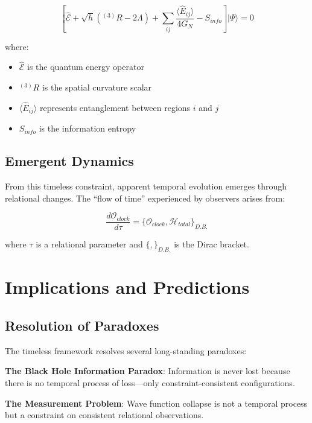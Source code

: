 \documentclass[12pt,a4paper]{article}
\begin{document}
\begin{equation}
\boxed{
\left[ \hat{\mathcal{E}} + \sqrt{h}\left({}^{(3)}R - 2\Lambda\right) + \sum_{ij} \frac{\langle \hat{E}_{ij} \rangle}{4G_N} - S_{info} \right] |\Psi\rangle = 0
}
\end{equation}

where:
\begin{itemize}
\item $\hat{\mathcal{E}}$ is the quantum energy operator
\item ${}^{(3)}R$ is the spatial curvature scalar
\item $\langle \hat{E}_{ij} \rangle$ represents entanglement between regions $i$ and $j$
\item $S_{info}$ is the information entropy
\end{itemize}

\subsection{Emergent Dynamics}

From this timeless constraint, apparent temporal evolution emerges through relational changes. The ``flow of time'' experienced by observers arises from:

\begin{equation}
\frac{d\mathcal{O}_{clock}}{d\tau} = \{\mathcal{O}_{clock}, \mathcal{H}_{total}\}_{D.B.}
\end{equation}

where $\tau$ is a relational parameter and $\{,\}_{D.B.}$ is the Dirac bracket.

\section{Implications and Predictions}

\subsection{Resolution of Paradoxes}

The timeless framework resolves several long-standing paradoxes:

\textbf{The Black Hole Information Paradox}: Information is never lost because there is no temporal process of loss---only constraint-consistent configurations.

\textbf{The Measurement Problem}: Wave function collapse is not a temporal process but a constraint on consistent relational observations.
\end{document}
